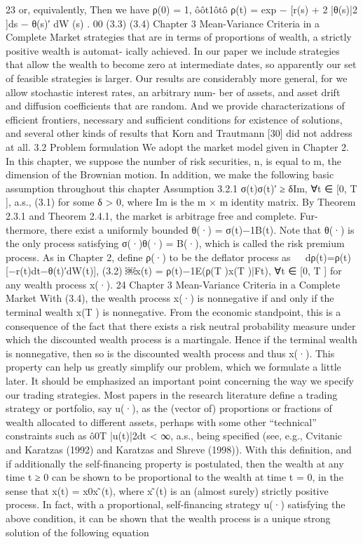 23
or, equivalently,
Then we have
ρ(0) = 1, ôôt1ôtô
ρ(t) = exp − [r(s) + 2 |θ(s)|2 ]ds − θ(s)′ dW (s) . 00
(3.3)
(3.4)
Chapter 3 Mean-Variance Criteria in a Complete Market
strategies that are in terms of proportions of wealth, a strictly positive wealth is automat- ically achieved. In our paper we include strategies that allow the wealth to become zero at intermediate dates, so apparently our set of feasible strategies is larger. Our results are considerably more general, for we allow stochastic interest rates, an arbitrary num- ber of assets, and asset drift and diffusion coefficients that are random. And we provide characterizations of efficient frontiers, necessary and sufficient conditions for existence of solutions, and several other kinds of results that Korn and Trautmann [30] did not address at all.
3.2 Problem formulation
We adopt the market model given in Chapter 2. In this chapter, we suppose the number of risk securities, n, is equal to m, the dimension of the Brownian motion. In addition, we make the following basic assumption throughout this chapter
Assumption 3.2.1
σ(t)σ(t)′ ≥ δIm, ∀t ∈ [0, T ], a.s., (3.1) for some δ > 0, where Im is the m × m identity matrix.
By Theorem 2.3.1 and Theorem 2.4.1, the market is arbitrage free and complete. Fur- thermore, there exist a uniformly bounded θ(·) = σ(t)−1B(t). Note that θ(·) is the only process satisfying σ(·)θ(·) = B(·), which is called the risk premium process.
As in Chapter 2, define ρ(·) to be the deflator process as
 dρ(t)=ρ(t)[−r(t)dt−θ(t)′dW(t)],
(3.2)
￼x(t) = ρ(t)−1E(ρ(T )x(T )|Ft), ∀t ∈ [0, T ] for any wealth process x(·).
24
Chapter 3 Mean-Variance Criteria in a Complete Market
With (3.4), the wealth process x(·) is nonnegative if and only if the terminal wealth x(T ) is nonnegative. From the economic standpoint, this is a consequence of the fact that there exists a risk neutral probability measure under which the discounted wealth process is a martingale. Hence if the terminal wealth is nonnegative, then so is the discounted wealth process and thus x(·). This property can help us greatly simplify our problem, which we formulate a little later.
It should be emphasized an important point concerning the way we specify our trading strategies. Most papers in the research literature define a trading strategy or portfolio, say u(·), as the (vector of) proportions or fractions of wealth allocated to different assets, perhaps with some other “technical” constraints such as ô0T |u(t)|2dt < ∞, a.s., being specified (see, e.g., Cvitanic and Karatzas (1992) and Karatzas and Shreve (1998)). With this definition, and if additionally the self-financing property is postulated, then the wealth at any time t ≥ 0 can be shown to be proportional to the wealth at time t = 0, in the sense that x(t) = x0x ̃(t), where x ̃(t) is an (almost surely) strictly positive process. In fact, with a proportional, self-financing strategy u(·) satisfying the above condition, it can be shown that the wealth process is a unique strong solution of the following equation
